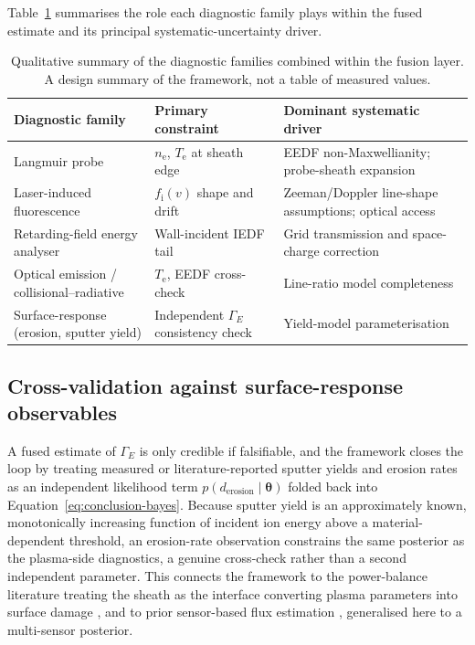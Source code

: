Table~\ref{ch25-tab:diagnostics} summarises the role each diagnostic family plays within the fused estimate and its principal systematic-uncertainty driver.

\begin{table}[htbp]
\centering
\caption{Qualitative summary of the diagnostic families combined within the fusion layer. A design summary of the framework, not a table of measured values.}
\label{ch25-tab:diagnostics}
\begin{tabularx}{\textwidth}{@{}l l X@{}}
\toprule
Diagnostic family & Primary constraint & Dominant systematic driver \\
\midrule
Langmuir probe & $n_{\mathrm{e}}$, $T_{\mathrm{e}}$ at sheath edge & EEDF non-Maxwellianity; probe-sheath expansion \\
Laser-induced fluorescence & $f_{\mathrm{i}}(v)$ shape and drift & Zeeman/Doppler line-shape assumptions; optical access \\
Retarding-field energy analyser & Wall-incident IEDF tail & Grid transmission and space-charge correction \\
Optical emission / collisional--radiative & $T_{\mathrm{e}}$, EEDF cross-check & Line-ratio model completeness \\
Surface-response (erosion, sputter yield) & Independent $\Gamma_{E}$ consistency check & Yield-model parameterisation \\
\bottomrule
\end{tabularx}
\end{table}

\subsection{Cross-validation against surface-response observables}
\label{ssec:conclusion-crossvalidation}

A fused estimate of $\Gamma_{E}$ is only credible if falsifiable, and the framework closes the loop by treating measured or literature-reported sputter yields and erosion rates as an independent likelihood term $p(d_{\mathrm{erosion}} \mid \boldsymbol{\theta})$ folded back into Equation~\eqref{eq:conclusion-bayes}. Because sputter yield is an approximately known, monotonically increasing function of incident ion energy above a material-dependent threshold, an erosion-rate observation constrains the same posterior as the plasma-side diagnostics, a genuine cross-check rather than a second independent parameter. This connects the framework to the power-balance literature treating the sheath as the interface converting plasma parameters into surface damage \cite{ref0093,ref0074,ref0105}, and to prior sensor-based flux estimation \cite{ref0075}, generalised here to a multi-sensor posterior.

